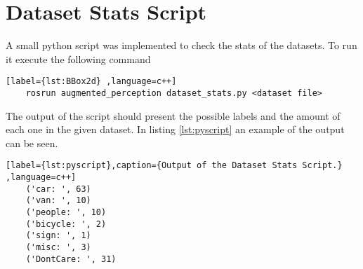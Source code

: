 \section{Dataset Stats Script}

A small python script was implemented to check the stats of the datasets. To run it execute the following command 

\begin{center}
	\begin{lstlisting}[label={lst:BBox2d} ,language=c++]
	rosrun augmented_perception dataset_stats.py <dataset file>\end{lstlisting}
\end{center}

The output of the script should present the possible labels and the amount of each one in the given dataset. In listing \ref{lst:pyscript} an example of the output can be seen.

\begin{center}
	\begin{lstlisting}[label={lst:pyscript},caption={Output of the Dataset Stats Script.} ,language=c++]
	('car: ', 63)
	('van: ', 10)
	('people: ', 10)
	('bicycle: ', 2)
	('sign: ', 1)
	('misc: ', 3)
	('DontCare: ', 31)\end{lstlisting}
\end{center}
